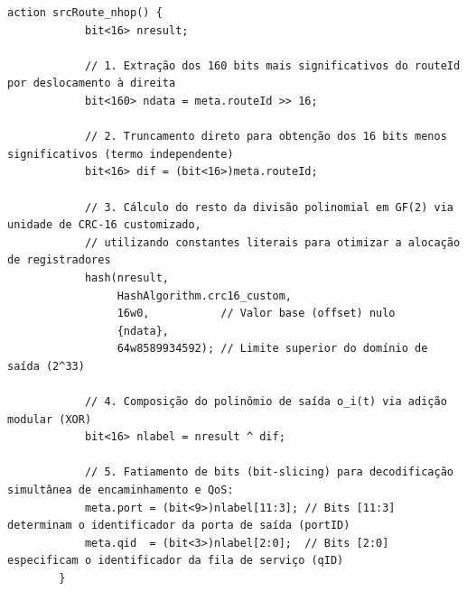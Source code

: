 \begin{quadro}[htb]
    \centering
    \caption{Função de cálculo do rótulo SPolKA em linguagem P4}
    \label{quad:codigo_controle}
    \begin{lstlisting}[language=P4]
        action srcRoute_nhop() {
            bit<16> nresult;
    
            // 1. Extração dos 160 bits mais significativos do routeId por deslocamento à direita
            bit<160> ndata = meta.routeId >> 16;
            
            // 2. Truncamento direto para obtenção dos 16 bits menos significativos (termo independente)
            bit<16> dif = (bit<16>)meta.routeId;
    
            // 3. Cálculo do resto da divisão polinomial em GF(2) via unidade de CRC-16 customizado,
            // utilizando constantes literais para otimizar a alocação de registradores
            hash(nresult,
                 HashAlgorithm.crc16_custom,
                 16w0,           // Valor base (offset) nulo
                 {ndata}, 
                 64w8589934592); // Limite superior do domínio de saída (2^33)
    
            // 4. Composição do polinômio de saída o_i(t) via adição modular (XOR)
            bit<16> nlabel = nresult ^ dif;
    
            // 5. Fatiamento de bits (bit-slicing) para decodificação simultânea de encaminhamento e QoS:
            meta.port = (bit<9>)nlabel[11:3]; // Bits [11:3] determinam o identificador da porta de saída (portID)
            meta.qid  = (bit<3>)nlabel[2:0];  // Bits [2:0] especificam o identificador da fila de serviço (qID)
        }
    \end{lstlisting}
\end{quadro}